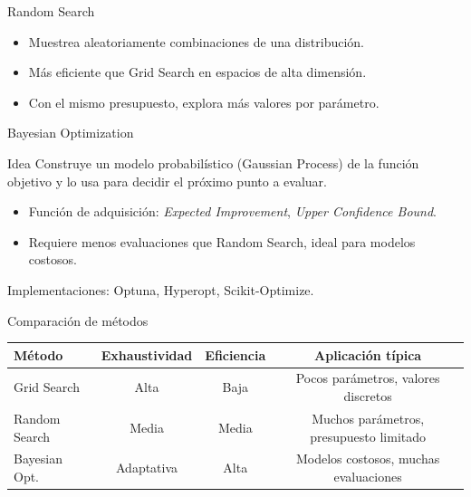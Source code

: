 \documentclass[aspectratio=169, 10pt, xcolor=table]{beamer}
\begin{document}
\begin{frame}{Random Search}
    \begin{itemize}
        \item Muestrea aleatoriamente combinaciones de una distribución.
        \item Más eficiente que Grid Search en espacios de alta dimensión.
        \item Con el mismo presupuesto, explora más valores por parámetro.
    \end{itemize}
\end{frame}

\begin{frame}{Bayesian Optimization}
    \begin{block}{Idea}
        Construye un modelo probabilístico (Gaussian Process) de la función objetivo y lo usa para decidir el próximo punto a evaluar.
    \end{block}
    \begin{itemize}
        \item Función de adquisición: \textit{Expected Improvement}, \textit{Upper Confidence Bound}.
        \item Requiere menos evaluaciones que Random Search, ideal para modelos costosos.
    \end{itemize}
    Implementaciones: Optuna, Hyperopt, Scikit-Optimize.
\end{frame}

\begin{frame}{Comparación de métodos}
    \begin{table}
        \centering
        \begin{tabular}{l|c|c|c}
            \toprule
            \textbf{Método} & \textbf{Exhaustividad} & \textbf{Eficiencia} & \textbf{Aplicación típica} \\
            \midrule
            Grid Search & Alta & Baja & Pocos parámetros, valores discretos \\
            Random Search & Media & Media & Muchos parámetros, presupuesto limitado \\
            Bayesian Opt. & Adaptativa & Alta & Modelos costosos, muchas evaluaciones \\
            \bottomrule
        \end{tabular}
    \end{table}
\end{frame}
\end{document}
